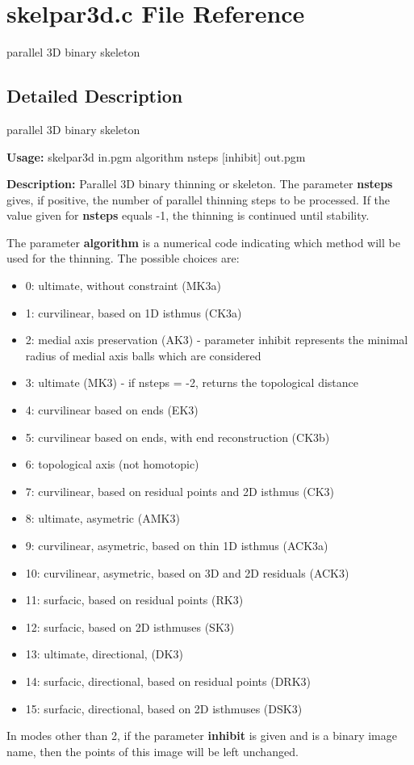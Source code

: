 \section{skelpar3d.c File Reference}
\label{skelpar3d_8c}
parallel 3D binary skeleton 



\subsection{Detailed Description}
parallel 3D binary skeleton 

{\bf Usage:} skelpar3d in.pgm algorithm nsteps [inhibit] out.pgm

{\bf Description:} Parallel 3D binary thinning or skeleton. The parameter {\bf nsteps} gives, if positive, the number of parallel thinning steps to be processed. If the value given for {\bf nsteps} equals -1, the thinning is continued until stability.

The parameter {\bf algorithm} is a numerical code indicating which method will be used for the thinning. The possible choices are: \begin{itemize}
\item 0: ultimate, without constraint (MK3a) \item 1: curvilinear, based on 1D isthmus (CK3a) \item 2: medial axis preservation (AK3) - parameter inhibit represents the minimal radius of medial axis balls which are considered \item 3: ultimate (MK3) - if nsteps = -2, returns the topological distance \item 4: curvilinear based on ends (EK3) \item 5: curvilinear based on ends, with end reconstruction (CK3b) \item 6: topological axis (not homotopic) \item 7: curvilinear, based on residual points and 2D isthmus (CK3) \item 8: ultimate, asymetric (AMK3) \item 9: curvilinear, asymetric, based on thin 1D isthmus (ACK3a) \item 10: curvilinear, asymetric, based on 3D and 2D residuals (ACK3) \item 11: surfacic, based on residual points (RK3) \item 12: surfacic, based on 2D isthmuses (SK3) \item 13: ultimate, directional, (DK3) \item 14: surfacic, directional, based on residual points (DRK3) \item 15: surfacic, directional, based on 2D isthmuses (DSK3)\end{itemize}
In modes other than 2, if the parameter {\bf inhibit} is given and is a binary image name, then the points of this image will be left unchanged.

